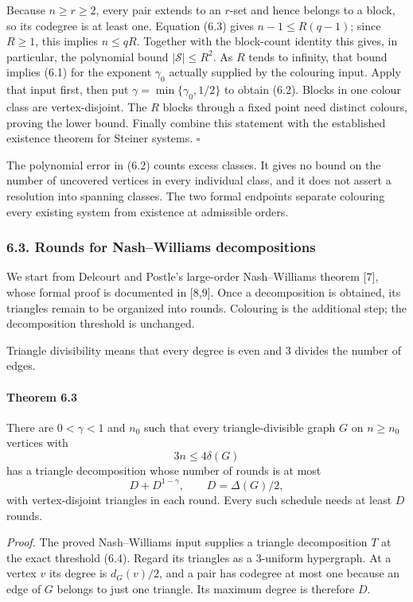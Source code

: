 \documentclass[english,11pt,a4paper]{article}
\begin{document}
Because \(n\ge r\ge2\), every pair extends to an \(r\)-set and hence belongs to a block, so its codegree is at least one. Equation (6.3) gives \(n-1\le R(q-1)\); since \(R\ge1\), this implies \(n\le qR\). Together with the block-count identity this gives, in particular, the polynomial bound \(|\mathcal S|\le R^2\). As \(R\) tends to infinity, that bound implies (6.1) for the exponent \(\gamma_0\) actually supplied by the colouring input. Apply that input first, then put \(\gamma=\min\{\gamma_0,1/2\}\) to obtain (6.2). Blocks in one colour class are vertex-disjoint. The \(R\) blocks through a fixed point need distinct colours, proving the lower bound. Finally combine this statement with the established existence theorem for Steiner systems. \(\square\)

The polynomial error in (6.2) counts excess classes. It gives no bound on the number of uncovered vertices in every individual class, and it does not assert a resolution into spanning classes. The two formal endpoints separate colouring every existing system from existence at admissible orders.


\subsubsection{6.3. Rounds for Nash--Williams decompositions}\label{rounds-for-nashwilliams-decompositions}

We start from Delcourt and Postle's large-order Nash--Williams theorem {[}7{]}, whose formal proof is documented in {[}8,9{]}. Once a decomposition is obtained, its triangles remain to be organized into rounds. Colouring is the additional step; the decomposition threshold is unchanged.

Triangle divisibility means that every degree is even and \(3\) divides the number of edges.

\par
\begin{samepage}
\paragraph{Theorem 6.3}\label{theorem-6.3}

There are \(0<\gamma<1\) and \(n_0\) such that every triangle-divisible graph \(G\) on \(n\ge n_0\) vertices with \[3n\le4\delta(G)
\tag{6.4}\] has a triangle decomposition whose number of rounds is at most \[D+D^{1-\gamma},\qquad D=\Delta(G)/2,
\tag{6.5}\] with vertex-disjoint triangles in each round. Every such schedule needs at least \(D\) rounds.

\end{samepage}
\emph{Proof.} The proved Nash--Williams input supplies a triangle decomposition \(T\) at the exact threshold (6.4). Regard its triangles as a \(3\)-uniform hypergraph. At a vertex \(v\) its degree is \(d_G(v)/2\), and a pair has codegree at most one because an edge of \(G\) belongs to just one triangle. Its maximum degree is therefore \(D\).
\end{document}
